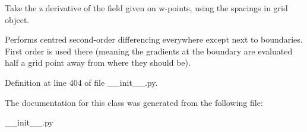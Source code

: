 Take the z derivative of the field given on w-\/points, using the spacings in grid object. 

Performs centred second-\/order differencing everywhere except next to boundaries. First order is used there (meaning the gradients at the boundary are evaluated half a grid point away from where they should be). 

Definition at line 404 of file \+\_\+\+\_\+init\+\_\+\+\_\+.\+py.



The documentation for this class was generated from the following file\+:\begin{DoxyCompactItemize}
\item 
\+\_\+\+\_\+init\+\_\+\+\_\+.\+py\end{DoxyCompactItemize}
